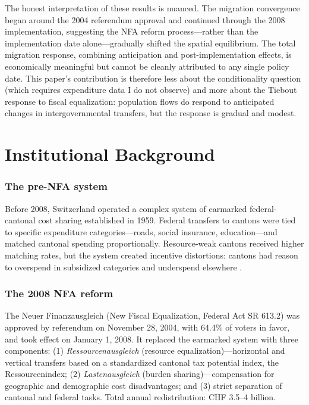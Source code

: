 \documentclass[12pt]{article}
\begin{document}
The honest interpretation of these results is nuanced. The migration convergence began around the 2004 referendum approval and continued through the 2008 implementation, suggesting the NFA reform process---rather than the implementation date alone---gradually shifted the spatial equilibrium. The total migration response, combining anticipation and post-implementation effects, is economically meaningful but cannot be cleanly attributed to any single policy date. This paper's contribution is therefore less about the conditionality question (which requires expenditure data I do not observe) and more about the Tiebout response to fiscal equalization: population flows do respond to anticipated changes in intergovernmental transfers, but the response is gradual and modest.

\section{Institutional Background}

\subsubsection*{The pre-NFA system} Before 2008, Switzerland operated a complex system of earmarked federal-cantonal cost sharing established in 1959. Federal transfers to cantons were tied to specific expenditure categories---roads, social insurance, education---and matched cantonal spending proportionally. Resource-weak cantons received higher matching rates, but the system created incentive distortions: cantons had reason to overspend in subsidized categories and underspend elsewhere \citep{DaffalonVaillancourt2003}.

\subsubsection*{The 2008 NFA reform} The Neuer Finanzausgleich (New Fiscal Equalization, Federal Act SR 613.2) was approved by referendum on November 28, 2004, with 64.4\% of voters in favor, and took effect on January 1, 2008. It replaced the earmarked system with three components: (1) \textit{Ressourcenausgleich} (resource equalization)---horizontal and vertical transfers based on a standardized cantonal tax potential index, the Ressourcenindex; (2) \textit{Lastenausgleich} (burden sharing)---compensation for geographic and demographic cost disadvantages; and (3) strict separation of cantonal and federal tasks. Total annual redistribution: CHF 3.5--4 billion.
\end{document}
